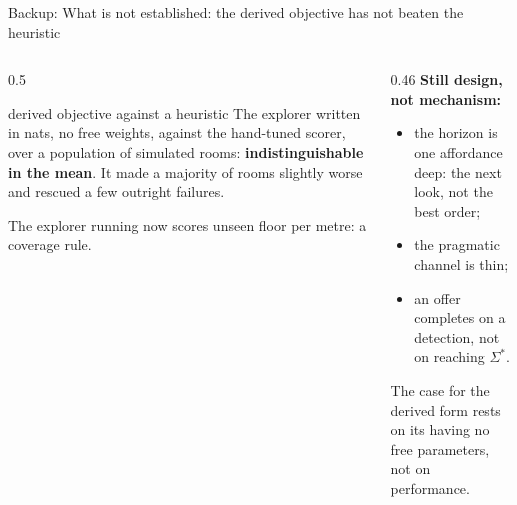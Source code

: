 \documentclass[10pt, aspectratio=169]{beamer}
\begin{document}
\begin{frame}{Backup: What is not established: the derived objective has not beaten the heuristic}
  \begin{columns}[T]
    \begin{column}{0.5\textwidth}
      \begin{measured}{derived objective against a heuristic}
        \small
        The explorer written in nats, no free weights, against the hand-tuned scorer, over a
        population of simulated rooms: \textbf{indistinguishable in the mean}. It made a majority of
        rooms slightly worse and rescued a few outright failures.
      \end{measured}
      \small
      The explorer running now scores unseen floor per metre: a coverage rule.
    \end{column}
    \begin{column}{0.46\textwidth}
      \small
      \textbf{Still design, not mechanism:}
      \begin{itemize}
        \item the horizon is one affordance deep: the next look, not the best order;
        \item the pragmatic channel is thin;
        \item an offer completes on a detection, not on reaching $\Sigma^\ast$.
      \end{itemize}
      \alert{The case for the derived form rests on its having no free parameters, not on performance.}
    \end{column}
  \end{columns}
\end{frame}
\end{document}
